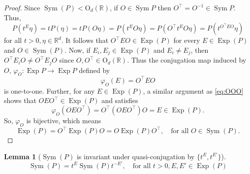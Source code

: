 \documentclass{article}
\theoremstyle{definition}
\newcommand\OdR{\mbox{O}_d(\mathbb{R})}
\newcommand\Sym{\operatorname{Sym}}
\newcommand\Exp{\operatorname{Exp}}
\newcommand{\R}{\mathbb{R}}
\theoremstyle{theorem}
\newtheorem{lemma}[theorem]{Lemma}
\begin{document}
\begin{proof}
Since $\Sym(P) < \OdR{}$, if $O\in \Sym{P}$ then $O^\top = O^{-1} \in \Sym{P}$. Thus,
\begin{equation}\label{eq:OOO}
    P(t^E \eta) = tP(\eta) = tP(O\eta) = P(t^E O\eta) = P(O^\top t^E O \eta) = P(t^{O^\top E O }\eta)
\end{equation}
for all $t>0,\eta\in \R^d$. It follows that $O^\top E O \in \Exp(P)$ for every $E\in \Exp(P)$ and $O\in \Sym(P)$.  
Now, if $E_i, E_j\in \Exp(P)$ and $E_i\neq E_j$, then $O^\top E_i O \neq O^\top E_j O$ since $O,O^\top\in \OdR{}$. Thus the conjugation map induced by $O$, $\varphi_O: \Exp{P}\to \Exp{P}$ defined by 
\begin{equation*}
    \varphi_O (E) = O^\top E O
\end{equation*}
is one-to-one. Further, for any $E\in \Exp(P)$, a similar argument as \eqref{eq:OOO} shows that $OEO^\top \in \Exp(P)$ and satisfies
\begin{equation*}
    \varphi_O(OEO^\top) = O^\top (OEO^\top) O = E\in \Exp{(P)}.
\end{equation*}
So, $\varphi_O$ is bijective, which means 
\begin{equation*}
    \Exp(P) = O^\top \Exp(P) O = O \Exp{(P)} O^\top, \quad \text{for all } O\in \Sym{(P)}.
\end{equation*}
\end{proof}



\begin{lemma}[$\Sym(P)$ is invariant under quasi-conjugation by $\{t^E,t^{E'}\}$]\label{lem:SymP}
\begin{equation*}
    \Sym{(P)} = t^E \Sym{(P)} t^{-E'}, \quad \text{for all } t>0,E,E'\in \Exp{(P)}
\end{equation*}
\end{lemma}
\end{document}
